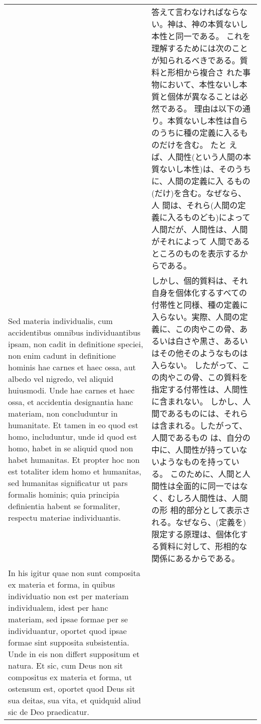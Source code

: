 \documentclass[10pt]{jsarticle} %
\begin{document}
\begin{longtable}{p{21em}p{21em}}
&

答えて言わなければならない。神は、神の本質ないし本性と同一である。
これを理解するためには次のことが知られるべきである。質料と形相から複合さ
 れた事物において、本性ないし本質と個体が異なることは必然である。
理由は以下の通り。本質ないし本性は自らのうちに種の定義に入るものだけを含む。
たと
 えば、人間性(という人間の本質ないし本性)は、そのうちに、人間の定義に入
 るもの(だけ)を含む。なぜなら、人
 間は、それら(人間の定義に入るものども)によって人間だが、人間性は、人間がそれによって
 人間であるところのものを表示するからである。



\\


Sed materia individualis, cum accidentibus omnibus individuantibus
 ipsam, non cadit in definitione speciei, non enim cadunt in definitione
 hominis hae carnes et haec ossa, aut albedo vel nigredo, vel aliquid
 huiusmodi.
Unde hae carnes et haec ossa, et accidentia designantia hanc materiam,
 non concluduntur in humanitate.
Et tamen in eo quod est homo, includuntur, unde id quod est homo, habet
 in se aliquid quod non habet humanitas.
Et propter hoc non est totaliter idem homo et humanitas, sed humanitas
 significatur ut pars formalis hominis; quia principia definientia
 habent se formaliter, respectu materiae individuantis.

&

しかし、個的質料は、それ自身を個体化するすべての付帯性と同様、種の定義に入らない。実際、人間の定義に、この肉やこの骨、あるいは白さや黒さ、あるいはその他そのようなものは入らない。
したがって、この肉やこの骨、この質料を指定する付帯性は、人間性に含まれない。
しかし、人間であるものには、それらは含まれる。したがって、人間であるもの
 は、自分の中に、人間性が持っていないようなものを持っている。
このために、人間と人間性は全面的に同一ではなく、むしろ人間性は、人間の形
 相的部分として表示される。なぜなら、(定義を)限定する原理は、個体化す
 る質料に対して、形相的な関係にあるからである。


\\


In his igitur quae non sunt composita ex materia et forma, in quibus
 individuatio non est per materiam individualem, idest per hanc
 materiam, sed ipsae formae per se individuantur, oportet quod ipsae
 formae sint supposita subsistentia.
Unde in eis non differt suppositum et natura.
Et sic, cum Deus non sit compositus ex materia et forma, ut ostensum
 est, oportet quod Deus sit sua deitas, sua vita, et quidquid aliud sic
 de Deo praedicatur.


\end{longtable}
\end{document}
